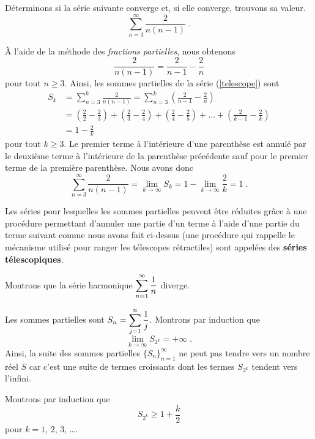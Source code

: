 {\begin{egg}
Déterminons si la série suivante converge et, si elle converge,
trouvons sa valeur.
\begin{equation}\label{telescope}
\sum_{n=3}^\infty \frac{2}{n(n-1)} \; .
\end{equation}

À l'aide de la méthode des {\em fractions partielles}, nous obtenons
\[
\frac{2}{n(n-1)} = \frac{2}{n-1} - \frac{2}{n}
\]
pour tout $n \geq 3$.  Ainsi, les sommes partielles de la série
(\ref{telescope}) sont
\begin{align*}
S_k &= \sum_{n=3}^k \frac{2}{n(n-1)}
= \sum_{n=3}^k \left( \frac{2}{n-1} - \frac{2}{n} \right) \\
&= \left( \frac{2}{2} - \frac{2}{3} \right) +
\left( \frac{2}{3} - \frac{2}{4} \right) +
\left( \frac{2}{4} - \frac{2}{5} \right) + \ldots
+\left( \frac{2}{k-1} - \frac{2}{k} \right) \\
&= 1 - \frac{2}{k}
\end{align*}
pour tout $k\geq 3$.  Le premier terme à l'intérieure d'une parenthèse est
annulé par le deuxième terme à l'intérieure de la parenthèse précédente sauf
pour le premier terme de la première parenthèse.  Nous avons donc
\[
\sum_{n=3}^\infty \frac{2}{n(n-1)} = \lim_{k\rightarrow \infty} S_k
= 1 - \lim_{k\rightarrow \infty} \frac{2}{k} = 1 \; .
\]

Les séries pour lesquelles les sommes partielles peuvent être réduites
grâce à une procédure permettant d'annuler une partie d'un terme à
l'aide d'une partie du terme suivant comme nous avons fait ci-dessus
(une procédure qui rappelle le mécanisme utilisé pour ranger les
télescopes rétractiles) sont appelées des {\bfseries séries télescopiques}.
\end{egg}

\begin{egg}[\theory\ \eng]
Montrons que la série harmonique
$\displaystyle \sum_{n=1}^\infty \frac{1}{n}$ diverge.

Les sommes partielles sont
$\displaystyle S_n = \sum_{j=1}^n \frac{1}{j}$.
Montrons par induction que
\[
\lim_{k\rightarrow \infty} S_{2^k} = +\infty \; .
\]
Ainsi, la suite des sommes partielles $\{S_n\}_{n=1}^\infty$ ne peut
pas tendre vers un nombre réel $S$ car c'est une suite de termes
croissants dont les termes $S_{2^k}$ tendent vers l'infini.

Montrons par induction que
\begin{equation}\label{harmInduct}
S_{2^k} \geq 1 + \frac{k}{2}
\end{equation}
pour $k=1$, $2$, $3$, \ldots.


\end{egg}}
